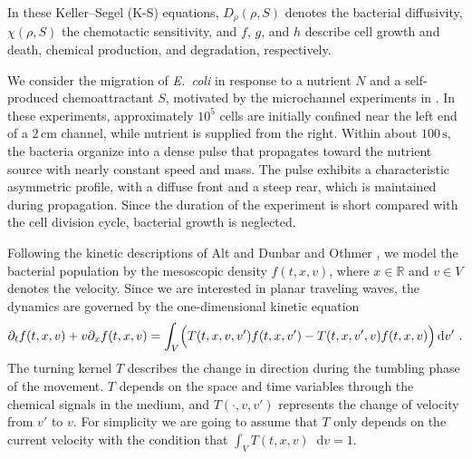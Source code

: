 \documentclass[11pt,twoside]{article}
\numberwithin{equation}{section}
\newcommand*\diff{\mathop{}\!\mathrm{d}}
\theoremstyle{plain}
\theoremstyle{nonumberplain}
\begin{document}
In these Keller--Segel (K-S) equations, $D_\rho(\rho,S)$ denotes the bacterial diffusivity, $\chi(\rho,S)$ the chemotactic
sensitivity, and $f$, $g$, and $h$ describe cell growth and death, chemical production,
and degradation, respectively.


We consider the migration of \textit{E.~coli} in response to a nutrient $N$ and a self-produced chemoattractant $S$, motivated by the microchannel experiments in \cite{saragosti2010mathematical}. In these experiments, approximately $10^5$ cells are initially confined near the left end of a $2\,\mathrm{cm}$ channel, while nutrient is supplied from the right. Within about $100\,\mathrm{s}$, the bacteria organize into a dense pulse that propagates toward the nutrient source with nearly constant speed and mass. The pulse exhibits a characteristic asymmetric profile, with a diffuse front and a steep rear, which is maintained during propagation. Since the duration of the experiment is short compared with the cell division cycle, bacterial growth is neglected.





Following the kinetic descriptions of Alt \cite{alt1980biased} and Dunbar and Othmer
\cite{othmer1988models}, we model the bacterial population by the mesoscopic density
$f(t,x,v)$, where $x \in \mathbb{R}$ and $v \in V$ denotes the velocity. Since we are
interested in planar traveling waves, the dynamics are governed by the one-dimensional
kinetic equation
\begin{equation}
    \partial_t f(t,x,v)+{v}\partial_x f(t,x,v)= \int_{V}\Bigl(T(t,x,v,v')f(t,x,v')-  T(t,x,{v}',v)f(t,x,v)\Bigr)\diff v'\ .\label{eq: main kinetic}
\end{equation}
 The turning kernel $T$ describes the change in direction during the tumbling phase of the movement. $T$ depends on the space and time variables through the chemical signals in the medium,  and $T(\cdot, v,v')$ represents the change of velocity from $v'$ to $v$. For simplicity we are going to assume that $T$ only depends on the current velocity with the condition that $\int_VT(t,x,v)\diff v=1$.
 
\end{document}
